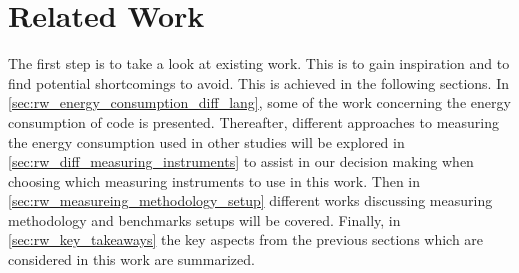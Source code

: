 \chapter{Related Work}\label{ch:related_work}

The first step is to take a look at existing work. This is to gain inspiration and to find potential shortcomings to avoid. This is achieved in the following sections. In \cref*{sec:rw_energy_consumption_diff_lang}, some of the work concerning the energy consumption of code is presented. Thereafter, different approaches to measuring the energy consumption used in other studies will be explored in \cref*{sec:rw_diff_measuring_instruments} to assist in our decision making when choosing which measuring instruments to use in this work. Then in \cref*{sec:rw_measureing_methodology_setup} different works discussing measuring methodology and benchmarks setups will be covered. Finally, in \cref*{sec:rw_key_takeaways} the key aspects from the previous sections which are considered in this work are summarized.


% 


